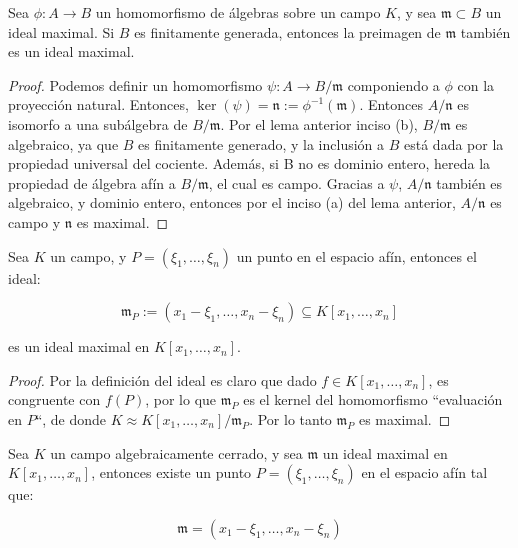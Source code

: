 \begin{proposition}\label{intersection of algebras-Nullstellensatz}
Sea $\phi: A \rightarrow B$ un homomorfismo de álgebras sobre un campo $K$, y sea $\mathfrak{m} \subset B$ un ideal maximal. Si $B$ es finitamente generada, entonces la preimagen de $\mathfrak{m}$ también es un ideal maximal.
\end{proposition}

\begin{proof}
Podemos definir un homomorfismo $\psi: A \rightarrow B/\mathfrak{m}$ componiendo a $\phi$ con la proyección natural. Entonces, $\ker(\psi) = \mathfrak{n} := \phi^{-1}(\mathfrak{m})$. Entonces $A/\mathfrak{n}$ es isomorfo a una subálgebra de $B/\mathfrak{m}$. Por el lema anterior inciso (b), $B/\mathfrak{m}$ es algebraico, ya que $B$ es finitamente generado, y la inclusión a $B$ está dada por la propiedad universal del cociente. Además, si B no es dominio entero, hereda la propiedad de álgebra afín a $B/\mathfrak{m}$, el cual es campo. Gracias a $\psi$, $A/\mathfrak{n}$ también es algebraico, y dominio entero, entonces por el inciso (a) del lema anterior, $A/\mathfrak{n}$ es campo y $\mathfrak{n}$ es maximal.
\end{proof}

\begin{lemma}\label{points->maximal-nullstellensatz}
Sea $K$ un campo, y $P = (\xi_1, \dots, \xi_n)$ un punto en el espacio afín, entonces el ideal:

$$ \mathfrak{m}_P := (x_1 - \xi_1, \dots, x_n - \xi_n) \subseteq K[x_1,\dots, x_n] $$

es un ideal maximal en $K[x_1,\dots, x_n]$.
\end{lemma}

\begin{proof}
Por la definición del ideal es claro que dado $f \in K[x_1,\dots, x_n]$, es congruente con $f(P)$, por lo que $\mathfrak{m}_P$ es el kernel del homomorfismo ``evaluación en $P$``, de donde $K \approx K[x_1,\dots, x_n]/\mathfrak{m}_P$. Por lo tanto $\mathfrak{m}_P$ es maximal.
\end{proof}

\begin{proposition} \label{maximal -> points-nullstellensatz}
Sea $K$ un campo algebraicamente cerrado, y sea $\mathfrak{m}$ un ideal maximal en $K[x_1,\dots,x_n]$, entonces existe un punto $P = (\xi_1,\dots,\xi_n)$ en el espacio afín tal que:

$$ \mathfrak{m} = (x_1 - \xi_1,\dots,x_n - \xi_n) $$
\end{proposition}

